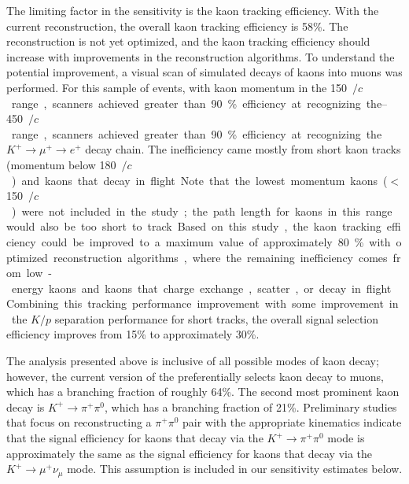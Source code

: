 The limiting factor in the sensitivity is the kaon tracking efficiency.  With the current reconstruction, 
the overall kaon tracking efficiency is \num{58}\%.
The reconstruction is not yet optimized, and the kaon tracking efficiency should increase with improvements in the reconstruction algorithms.  
To understand the potential improvement, a visual scan of simulated decays of kaons into muons was performed. For this sample of events, with kaon momentum in the \SIrange{150}{450}{\MeV$/c$} range, scanners achieved greater than \num{90}\% efficiency at recognizing the $K^{+} \rightarrow \mu^{+} \rightarrow e^{+}$ decay chain.  The inefficiency came mostly from short kaon tracks (momentum below \SI{180}{\MeV$/c$}) and kaons that decay in flight. Note that the lowest momentum kaons ($<$\SI{150}{\MeV$/c$}) were not included in the study; the path length for kaons in this range would also be too short to track.  Based on this study, the kaon tracking efficiency could be improved to a maximum value of approximately \num{80}\% with optimized reconstruction algorithms, where the remaining inefficiency comes from low-energy kaons and kaons that charge exchange, scatter, or decay in flight.
Combining this tracking performance improvement with some improvement in the $K/p$ separation performance for short tracks, the overall signal selection efficiency improves from \num{15}\% to approximately \num{30}\%.

The analysis presented above is inclusive of all possible modes of kaon decay; however, the current version of the  preferentially selects kaon decay to muons, which has a branching fraction of roughly \num{64}\%. The second most prominent kaon decay is $K^{+} \rightarrow \pi^{+}\pi^0$, which has a branching fraction of \num{21}\%.  Preliminary studies that focus on reconstructing a $\pi^{+}\pi^0$ pair with the appropriate kinematics indicate that the signal efficiency for kaons that decay via the $K^{+} \rightarrow \pi^{+}\pi^0$ mode is approximately the same as the signal efficiency for kaons that decay via the $K^{+} \rightarrow \mu^{+}\nu_{\mu}$ mode.  This assumption is included in our sensitivity estimates below.

